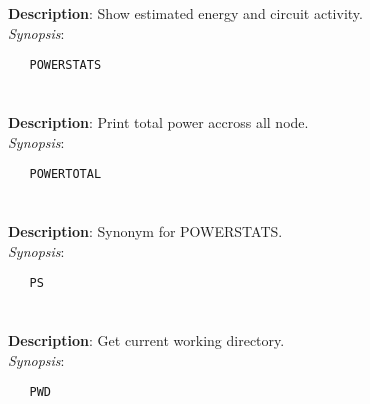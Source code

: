 \section{\quad{}}
\label{manpages:POWERSTATS}
\label{manpages:powerstats}
\vspace{-0.1in}
{\bf Description}: 	Show estimated energy and circuit activity.\\[1.5ex]
{\em Synopsis}:
\vspace{-0.05in}
\scriptsize
\begin{lstlisting}
   POWERSTATS   								
\end{lstlisting}
\normalsize
\vspace{-0.05in}


\section{\quad{}}
\label{manpages:POWERTOTAL}
\label{manpages:powertotal}
\vspace{-0.1in}
{\bf Description}: 	Print total power accross all node.\\[1.5ex]
{\em Synopsis}:
\vspace{-0.05in}
\scriptsize
\begin{lstlisting}
   POWERTOTAL   																				
\end{lstlisting}
\normalsize
\vspace{-0.05in}


\section{\quad{}}
\label{manpages:PS}
\label{manpages:ps}
\vspace{-0.1in}
{\bf Description}: 	Synonym for POWERSTATS.\\[1.5ex]
{\em Synopsis}:
\vspace{-0.05in}
\scriptsize
\begin{lstlisting}
   PS   											
\end{lstlisting}
\normalsize
\vspace{-0.05in}


\section{\quad{}}
\label{manpages:PWD}
\label{manpages:pwd}
\vspace{-0.1in}
{\bf Description}: 	Get current working directory.\\[1.5ex]
{\em Synopsis}:
\vspace{-0.05in}
\scriptsize
\begin{lstlisting}
   PWD   																					
\end{lstlisting}
\normalsize
\vspace{-0.05in}



